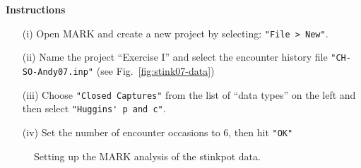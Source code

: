 \documentclass[12pt]{article}\usepackage[]{graphicx}\usepackage[]{color}
\begin{document}
\clearpage

{\bf Instructions}
\begin{enumerate}
  \item[(i)] Open MARK and create a new project by selecting:
    \verb+"File > New"+.
  \item[(ii)] Name the project ``Exercise I'' and select the encounter
    history file \verb+"CH-SO-Andy07.inp"+ (see
    Fig.~\ref{fig:stink07-data})
  \item[(iii)] Choose \verb+"Closed Captures"+ from the list of ``data
    types'' on the left and then select %
    \verb+"Huggins' p and c"+.
  \item[(iv)] Set the number of encounter occasions to 6, then hit
    \verb+"OK"+
\end{enumerate}

\begin{figure}[h!]
  \centering
  \caption{\small Setting up the MARK analysis of the stinkpot data.}
  \label{fig:stink07-mark}
\end{figure}
\end{document}
